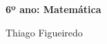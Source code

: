 




\begingroup\thispagestyle{empty}

                
              \vspace*{\fill}
              \begin{center}
              \bigskip

              {\LARGE\textbf{6º ano: Matemática}}

              \bigskip
              \bigskip
              \bigskip

              {\Large
                            Thiago Figueiredo

                            }
              \end{center}
              \vspace*{\fill}

\endgroup
\pagebreak